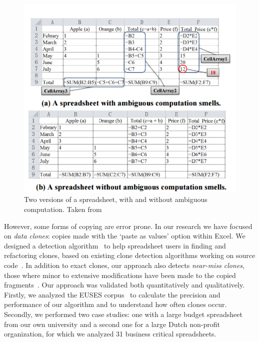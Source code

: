 \documentclass[conference]{IEEEtran}
\begin{document}
\begin{figure}
  \begin{center}
  \includegraphics[width=\columnwidth]{fig/ambig.png}
  \caption{Two versions of a spreadsheet, with and without ambiguous computation. Taken from }
  \label{fig:ambig}
  \end{center}
\end{figure} 

However, some forms of copying are error prone. In our research we have focused on \emph{data clones}: copies made with the `paste as values' option within Excel. We designed a detection algorithm~\cite{hermans_data_2013} to help spreadsheet users in finding and refactoring clones, based on existing clone detection algorithms working on source code~\cite{DBLP:conf/cascon/Johnson93}. In addition to exact clones, our approach also detects \emph{near-miss clones}, those where minor to extensive modifications have been made to the copied fragments~\cite{DBLP:conf/icsm/Roy09}. Our approach was  validated both quantitatively and qualitatively. Firstly, we analyzed the EUSES corpus~\cite{fisher_euses_2005} to calculate the precision and performance of our algorithm and to understand how often clones occur. Secondly, we performed two case studies: one with a large budget spreadsheet from our own university and a second one for a large Dutch non-profit organization, for which we analyzed 31 business critical spreadsheets.
\end{document}
